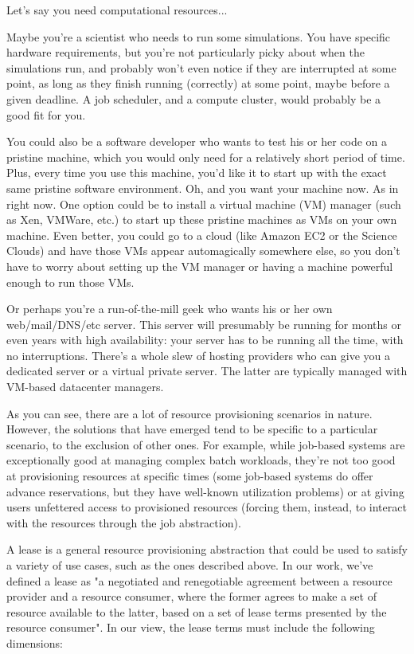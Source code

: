 
Let's say you need computational resources...

Maybe you're a scientist who needs to run some simulations. You have specific hardware requirements, but you're not particularly picky about when the simulations run, and probably won't even notice if they are interrupted at some point, as long as they finish running (correctly) at some point, maybe before a given deadline. A job scheduler, and a compute cluster, would probably be a good fit for you.

You could also be a software developer who wants to test his or her code on a pristine machine, which you would only need for a relatively short period of time. Plus, every time you use this machine, you'd like it to start up with the exact same pristine software environment. Oh, and you want your machine now. As in right now. One option could be to install a virtual machine (VM) manager (such as Xen, VMWare, etc.) to start up these pristine machines as VMs on your own machine. Even better, you could go to a cloud (like Amazon EC2 or the Science Clouds) and have those VMs appear automagically somewhere else, so you don't have to worry about setting up the VM manager or having a machine powerful enough to run those VMs.

Or perhaps you're a run-of-the-mill geek who wants his or her own web/mail/DNS/etc server. This server will presumably be running for months or even years with high availability: your server has to be running all the time, with no interruptions. There's a whole slew of hosting providers who can give you a dedicated server or a virtual private server. The latter are typically managed with VM-based datacenter managers.

As you can see, there are a lot of resource provisioning scenarios in nature. However, the solutions that have emerged tend to be specific to a particular scenario, to the exclusion of other ones. For example, while job-based systems are exceptionally good at managing complex batch workloads, they're not too good at provisioning resources at specific times (some job-based systems do offer advance reservations, but they have well-known utilization problems) or at giving users unfettered access to provisioned resources (forcing them, instead, to interact with the resources through the job abstraction).

A lease is a general resource provisioning abstraction that could be used to satisfy a variety of use cases, such as the ones described above. In our work, we've defined a lease as "a negotiated and renegotiable agreement between a resource provider and a resource consumer, where the former agrees to make a set of resource available to the latter, based on a set of lease terms presented by the resource consumer". In our view, the lease terms must include the following dimensions:


